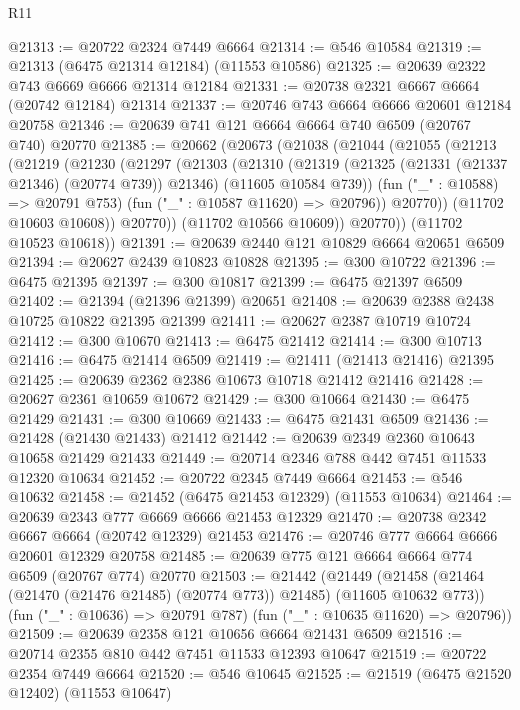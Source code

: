 \begin{lexlean}{R11}
\begin{coremodule}
@21313 := @20722 @2324 @7449 @6664
@21314 := @546 @10584
@21319 := @21313 (@6475 @21314 @12184) (@11553 @10586)
@21325 := @20639 @2322 @743 @6669 @6666 @21314 @12184
@21331 := @20738 @2321 @6667 @6664 (@20742 @12184) @21314
@21337 := @20746 @743 @6664 @6666 @20601 @12184 @20758
@21346 := @20639 @741 @121 @6664 @6664 @740 @6509 (@20767 @740) @20770
@21385 := @20662
    (@20673
      (@21038
        (@21044
          (@21055
            (@21213
              (@21219
                (@21230
                  (@21297
                    (@21303
                      (@21310
                        (@21319
                          (@21325 (@21331 (@21337 @21346) (@20774 @739)) @21346)
                          (@11605 @10584 @739))
                        (fun ("_" : @10588) => @20791 @753)
                        (fun ("_" : @10587 @11620) => @20796))
                      @20770))
                  (@11702 @10603 @10608))
                @20770))
            (@11702 @10566 @10609))
          @20770))
      (@11702 @10523 @10618))
@21391 := @20639 @2440 @121 @10829 @6664 @20651 @6509
@21394 := @20627 @2439 @10823 @10828
@21395 := @300 @10722
@21396 := @6475 @21395
@21397 := @300 @10817
@21399 := @6475 @21397 @6509
@21402 := @21394 (@21396 @21399) @20651
@21408 := @20639 @2388 @2438 @10725 @10822 @21395 @21399
@21411 := @20627 @2387 @10719 @10724
@21412 := @300 @10670
@21413 := @6475 @21412
@21414 := @300 @10713
@21416 := @6475 @21414 @6509
@21419 := @21411 (@21413 @21416) @21395
@21425 := @20639 @2362 @2386 @10673 @10718 @21412 @21416
@21428 := @20627 @2361 @10659 @10672
@21429 := @300 @10664
@21430 := @6475 @21429
@21431 := @300 @10669
@21433 := @6475 @21431 @6509
@21436 := @21428 (@21430 @21433) @21412
@21442 := @20639 @2349 @2360 @10643 @10658 @21429 @21433
@21449 := @20714 @2346 @788 @442 @7451 @11533 @12320 @10634
@21452 := @20722 @2345 @7449 @6664
@21453 := @546 @10632
@21458 := @21452 (@6475 @21453 @12329) (@11553 @10634)
@21464 := @20639 @2343 @777 @6669 @6666 @21453 @12329
@21470 := @20738 @2342 @6667 @6664 (@20742 @12329) @21453
@21476 := @20746 @777 @6664 @6666 @20601 @12329 @20758
@21485 := @20639 @775 @121 @6664 @6664 @774 @6509 (@20767 @774) @20770
@21503 := @21442
    (@21449
      (@21458 (@21464 (@21470 (@21476 @21485) (@20774 @773)) @21485) (@11605 @10632 @773))
      (fun ("_" : @10636) => @20791 @787)
      (fun ("_" : @10635 @11620) => @20796))
@21509 := @20639 @2358 @121 @10656 @6664 @21431 @6509
@21516 := @20714 @2355 @810 @442 @7451 @11533 @12393 @10647
@21519 := @20722 @2354 @7449 @6664
@21520 := @546 @10645
@21525 := @21519 (@6475 @21520 @12402) (@11553 @10647)

\end{coremodule}
\end{lexlean}
